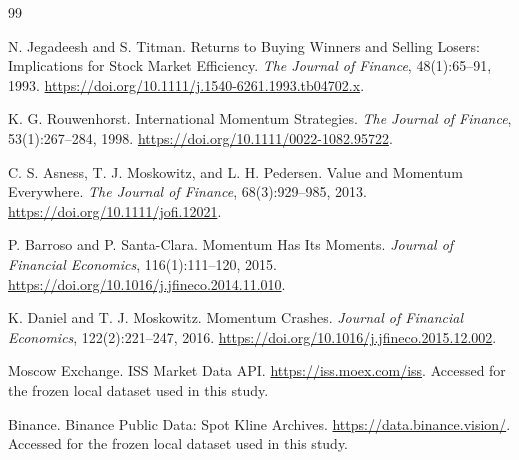 \documentclass[11pt,a4paper]{article}
\begin{document}
\begin{thebibliography}{99}

N. Jegadeesh and S. Titman.
Returns to Buying Winners and Selling Losers: Implications for Stock Market Efficiency.
\textit{The Journal of Finance}, 48(1):65--91, 1993.
\url{https://doi.org/10.1111/j.1540-6261.1993.tb04702.x}.

K. G. Rouwenhorst.
International Momentum Strategies.
\textit{The Journal of Finance}, 53(1):267--284, 1998.
\url{https://doi.org/10.1111/0022-1082.95722}.

C. S. Asness, T. J. Moskowitz, and L. H. Pedersen.
Value and Momentum Everywhere.
\textit{The Journal of Finance}, 68(3):929--985, 2013.
\url{https://doi.org/10.1111/jofi.12021}.

P. Barroso and P. Santa-Clara.
Momentum Has Its Moments.
\textit{Journal of Financial Economics}, 116(1):111--120, 2015.
\url{https://doi.org/10.1016/j.jfineco.2014.11.010}.

K. Daniel and T. J. Moskowitz.
Momentum Crashes.
\textit{Journal of Financial Economics}, 122(2):221--247, 2016.
\url{https://doi.org/10.1016/j.jfineco.2015.12.002}.

Moscow Exchange.
ISS Market Data API.
\url{https://iss.moex.com/iss}.
Accessed for the frozen local dataset used in this study.

Binance.
Binance Public Data: Spot Kline Archives.
\url{https://data.binance.vision/}.
Accessed for the frozen local dataset used in this study.

\end{thebibliography}
\end{document}
